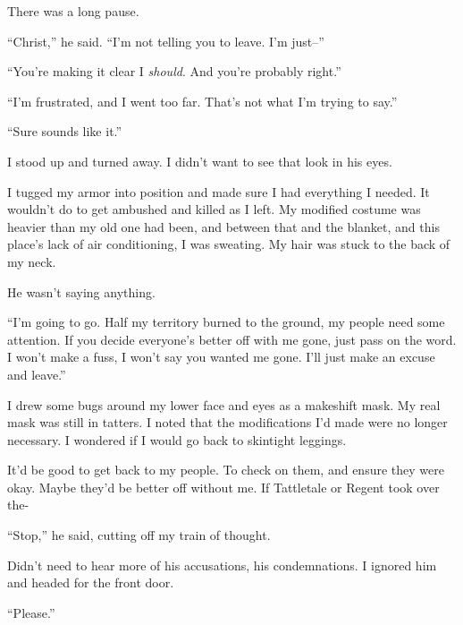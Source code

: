 There was a long pause.



``Christ,'' he said.  ``I'm not telling you to leave.  I'm just--''



``You're making it clear I \emph{should}. And you're probably right.''



``I'm frustrated, and I went too far.  That's not what I'm trying to say.''



``Sure sounds like it.''



I stood up and turned away.  I didn't want to see that look in his eyes.



I tugged my armor into position and made sure I had everything I needed.  It wouldn't do to get ambushed and killed as I left.  My modified costume was heavier than my old one had been, and between that and the blanket, and this place's lack of air conditioning, I was sweating.  My hair was stuck to the back of my neck.



He wasn't saying anything.



``I'm going to go.  Half my territory burned to the ground, my people need some attention.  If you decide everyone's better off with me gone, just pass on the word.  I won't make a fuss, I won't say you wanted me gone.  I'll just make an excuse and leave.''



I drew some bugs around my lower face and eyes as a makeshift mask.  My real mask was still in tatters.  I noted that the modifications I'd made were no longer necessary.  I wondered if I would go back to skintight leggings.



It'd be good to get back to my people.  To check on them, and ensure they were okay.  Maybe they'd be better off without me.  If Tattletale or Regent took over the-



``Stop,'' he said, cutting off my train of thought.



Didn't need to hear more of his accusations, his condemnations.  I ignored him and headed for the front door.



``Please.''




